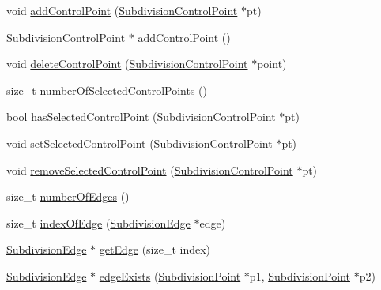 \begin{DoxyCompactItemize}
\item 
void \hyperlink{classShipCAD_1_1SubdivisionSurface_a7ac8b717bcb728da2334cc2f16c8b428}{add\-Control\-Point} (\hyperlink{classShipCAD_1_1SubdivisionControlPoint}{Subdivision\-Control\-Point} $\ast$pt)
\item 
\hyperlink{classShipCAD_1_1SubdivisionControlPoint}{Subdivision\-Control\-Point} $\ast$ \hyperlink{classShipCAD_1_1SubdivisionSurface_a7eccf33cb39ef12f56553352da34da62}{add\-Control\-Point} ()
\item 
void \hyperlink{classShipCAD_1_1SubdivisionSurface_ad4f874132a137e89a39e60572748dab0}{delete\-Control\-Point} (\hyperlink{classShipCAD_1_1SubdivisionControlPoint}{Subdivision\-Control\-Point} $\ast$point)
\item 
size\-\_\-t \hyperlink{classShipCAD_1_1SubdivisionSurface_ac15e844f2feb644d71b1de3a886f6970}{number\-Of\-Selected\-Control\-Points} ()
\item 
bool \hyperlink{classShipCAD_1_1SubdivisionSurface_aafd696ac2c5353ac5593acdbe8b1fb2e}{has\-Selected\-Control\-Point} (\hyperlink{classShipCAD_1_1SubdivisionControlPoint}{Subdivision\-Control\-Point} $\ast$pt)
\item 
void \hyperlink{classShipCAD_1_1SubdivisionSurface_a65cc43d93da8ed72af631e893057c773}{set\-Selected\-Control\-Point} (\hyperlink{classShipCAD_1_1SubdivisionControlPoint}{Subdivision\-Control\-Point} $\ast$pt)
\item 
void \hyperlink{classShipCAD_1_1SubdivisionSurface_a5be891c06dc5e441511fbdb73d71efeb}{remove\-Selected\-Control\-Point} (\hyperlink{classShipCAD_1_1SubdivisionControlPoint}{Subdivision\-Control\-Point} $\ast$pt)
\item 
size\-\_\-t \hyperlink{classShipCAD_1_1SubdivisionSurface_a74c607d9835c69a00b7730fad5384037}{number\-Of\-Edges} ()
\item 
size\-\_\-t \hyperlink{classShipCAD_1_1SubdivisionSurface_aa3d68eacb2fafd9dab6d40c3230ed991}{index\-Of\-Edge} (\hyperlink{classShipCAD_1_1SubdivisionEdge}{Subdivision\-Edge} $\ast$edge)
\item 
\hyperlink{classShipCAD_1_1SubdivisionEdge}{Subdivision\-Edge} $\ast$ \hyperlink{classShipCAD_1_1SubdivisionSurface_a67e69fc54ca38627596efc49b6d82e7f}{get\-Edge} (size\-\_\-t index)
\item 
\hyperlink{classShipCAD_1_1SubdivisionEdge}{Subdivision\-Edge} $\ast$ \hyperlink{classShipCAD_1_1SubdivisionSurface_adfdeabdc19eb55a7ba4ab0b607207300}{edge\-Exists} (\hyperlink{classShipCAD_1_1SubdivisionPoint}{Subdivision\-Point} $\ast$p1, \hyperlink{classShipCAD_1_1SubdivisionPoint}{Subdivision\-Point} $\ast$p2)

\end{DoxyCompactItemize}
